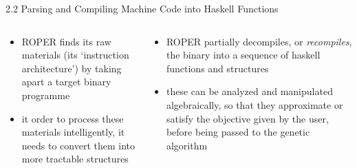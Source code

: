 \documentclass[9pt]{beamer}
\begin{document}
\begin{frame}{2.2 Parsing and Compiling Machine Code into Haskell Functions}
\begin{columns}
\begin{column}{.5\textwidth}
\begin{itemize}
\item ROPER finds its raw materials (its `instruction architecture') by taking apart a target binary programme
\vspace{1.3cm}
\item it order to process these materials intelligently, it needs to convert them into more tractable structures
\end{itemize}
\end{column}
\begin{column}{.5\textwidth}
\begin{itemize}

\item ROPER partially {decompiles}, or \emph{recompiles}, the binary into a sequence of haskell functions and structures
\vspace{1cm}
\item these can be analyzed and manipulated algebraically, so that they approximate or satisfy the objective given by the user, before being passed to the genetic algorithm
\end{itemize}

\end{column}

\end{columns}
    
\end{frame}
\end{document}
